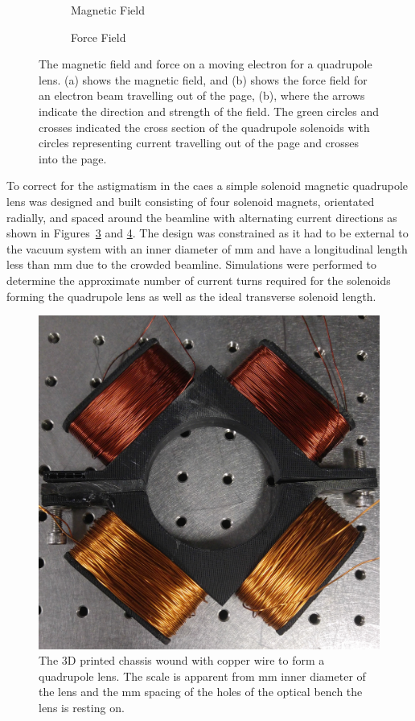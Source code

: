 \begin{figure}
    \centering
    \begin{subfigure}{0.49\linewidth}
    \centering
    
    \caption{Magnetic Field}
    \label{figure:quadrupole_example_field}
    \end{subfigure}
    \begin{subfigure}{0.49\linewidth}
    \centering
    
    \caption{Force Field}
    \label{figure:quadrupole_example_force}
    \end{subfigure}
    \caption[Quadrupole magnetic and force fields.]{The magnetic field and force on a moving electron for a quadrupole lens. (a) shows the magnetic field, and (b) shows the force field for an electron beam travelling out of the page, (b), where the arrows indicate the direction and strength of the field.
    The green circles and crosses indicated the cross section of the quadrupole solenoids with circles representing current travelling out of the page and crosses into the page.}
    \label{figure:quadrupole_example}
\end{figure}

To correct for the astigmatism in the \gls{caes} a simple solenoid magnetic quadrupole lens was designed and built consisting of four solenoid magnets, orientated radially, and spaced around the beamline with alternating current directions as shown in Figures~\ref{figure:quadrupole_example} and \ref{figure:quadrupole}.
The design was constrained as it had to be external to the vacuum system with an inner diameter of \unit[70]{mm} and have a longitudinal length less than \unit[20]{mm} due to the crowded beamline.
Simulations were performed to determine the approximate number of current turns required for the solenoids forming the quadrupole lens as well as the ideal transverse solenoid length.

\begin{figure}
    \centering
    \includegraphics[width=0.5\linewidth]{part2/Figs/quadrupole.jpg}
    \caption[3D printed quadrupole lens.]{The 3D printed chassis wound with copper wire to form a quadrupole lens. The scale is apparent from \unit[70]{mm} inner diameter of the lens and the \unit[25]{mm} spacing of the holes of the optical bench the lens is resting on.}
    \label{figure:quadrupole}
\end{figure}

